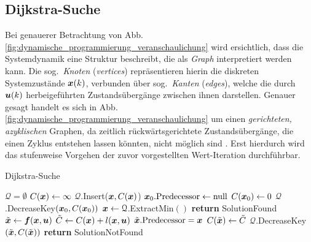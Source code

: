 \subsection{Dijkstra-Suche}
Bei genauerer Betrachtung von Abb.\,\ref{fig:dynamische_programmierung_veranschaulichung} wird ersichtlich, dass die Systemdynamik eine Struktur beschreibt, die als \emph{Graph} \cite{lavalle2006pa} interpretiert werden kann. Die sog.\ \emph{Knoten} (\emph{vertices}) repräsentieren hierin die diskreten Systemzustände $\boldsymbol{x}(k)$, verbunden über sog.\ \emph{Kanten} (\emph{edges}), welche die durch $\boldsymbol{u}(k)$ herbeigeführten Zustandsübergänge zwischen ihnen darstellen. 
Genauer gesagt handelt es sich in Abb.\,\ref{fig:dynamische_programmierung_veranschaulichung} um einen \emph{gerichteten, azyklischen} Graphen, da zeitlich rückwärtsgerichtete Zustandsübergänge, die einen Zyklus entstehen lassen könnten, nicht möglich sind \cite{zieg09spatemp}. Erst hierdurch wird das stufenweise Vorgehen der zuvor vorgestellten Wert-Iteration durchführbar.

\renewcommand{\algorithmiccomment}[1]{// #1}
\begin{algorithm}[ht]
 \caption{Dijkstra-Suche \cite{lavalle2006pa}}
 \begin{algorithmic}[1]
\STATE $\mathcal Q = \emptyset$ 
\STATE $C(\boldsymbol{x}) \leftarrow \infty$ 				 \label{ln:dij:infty}
\STATE $\mathcal Q$.Insert($\boldsymbol{x},C(\boldsymbol{x})$) \label{ln:dij:q_insert}
\ENDFOR
\STATE $\boldsymbol{x}_0.\text{Predecessor} \leftarrow \text{null}$
\STATE $C(\boldsymbol{x}_0) \leftarrow 0$ 						 \label{ln:dij:zero}
\STATE $\mathcal Q$.DecreaseKey$(\boldsymbol{x}_0, C(\boldsymbol{x}_0))$ \label{ln:dij:q_decrease1}
	\STATE $\boldsymbol{x} \leftarrow \mathcal Q$.ExtractMin$()$ \label{ln:dij:ExtractMin}
		\STATE \textbf{return} SolutionFound \label{ln:dij:xf}
	\ELSE 
			\STATE $\tilde{\boldsymbol{x}} \leftarrow \boldsymbol{f}(\boldsymbol{x},\boldsymbol{u})$ \label{ln:dij:x_next}
			\STATE $\tilde C \leftarrow C(\boldsymbol{x}) + l(\boldsymbol{x}, \boldsymbol{u})$
			\STATE $\tilde{\boldsymbol{x}}.\text{Predecessor}=\boldsymbol{x}$ \label{ln:dij:predesessor}
			\STATE $C(\tilde{\boldsymbol{x}}) \leftarrow \tilde C$
			\STATE $\mathcal Q$.DecreaseKey$(\tilde{\boldsymbol{x}},C(\tilde{\boldsymbol{x}}))$ \label{ln:dij:q_decrease}
			\ENDIF
		\ENDFOR
	\ENDIF
\ENDWHILE
\STATE \textbf{return} SolutionNotFound \label{ln:dij:nosolution}
 \end{algorithmic}
 \label{alg:Dijkstra}
 \end{algorithm}


